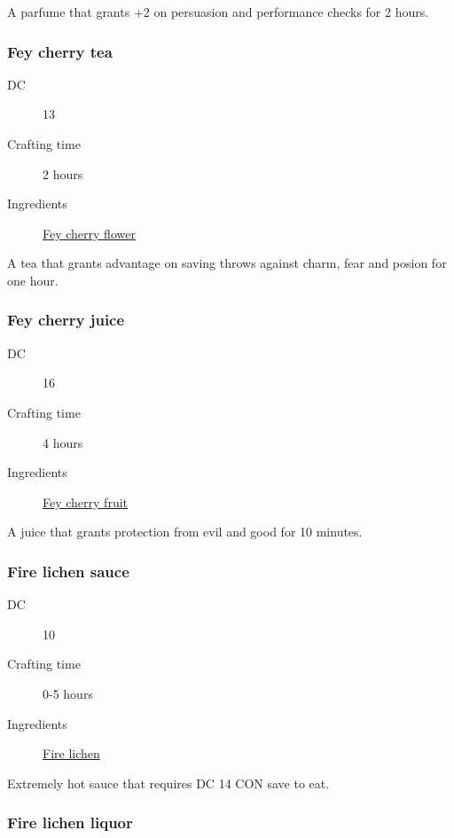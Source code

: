 A parfume that grants +2 on persuasion and performance checks for 2 hours.

\subsubsection{Fey cherry tea}
\label{Fey cherry tea}

\begin{description}
\item [DC] 13
\item [Crafting time] 2 hours
\item [Ingredients] \hyperref[Fey cherry]{Fey cherry flower}
\end{description}

A tea that grants advantage on saving throws against charm, fear and posion for one hour. 

\subsubsection{Fey cherry juice}
\label{Fey cherry juice}

\begin{description}
\item [DC] 16
\item [Crafting time] 4 hours
\item [Ingredients] \hyperref[Fey cherry]{Fey cherry fruit}
\end{description}

A juice that grants protection from evil and good for 10 minutes.

\subsubsection{Fire lichen sauce}
\label{Fire lichen sauce}

\begin{description}
\item [DC] 10
\item [Crafting time] 0-5 hours
\item [Ingredients] \hyperref[Fire lichen]{Fire lichen}
\end{description}

Extremely hot sauce that requires DC 14 CON save to eat.

\subsubsection{Fire lichen liquor}
\label{Fire lichen liquor}

